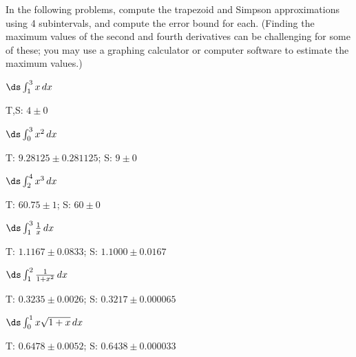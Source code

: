\begin{enumialphparenastyle}

In the following problems, compute the trapezoid and Simpson
approximations using 4 subintervals, and compute the error bound
for each. (Finding the maximum values of the second and fourth
derivatives can be challenging for some of these; you may use a
graphing calculator or computer software to estimate the maximum
values.) 




\begin{ex}
 $\ds\int_1^3 x\,dx$
\begin{sol}
 T,S: $4\pm0$
\end{sol}
\end{ex}

\begin{ex}
 $\ds\int_0^3 x^2\,dx$
\begin{sol}
 T: $9.28125\pm0.281125 $; S: $9\pm0$
\end{sol}
\end{ex}

\begin{ex}
 $\ds\int_2^4 x^3\,dx$
\begin{sol}
 T: $60.75\pm1$; S: $60\pm0$
\end{sol}
\end{ex}

\begin{ex}
 $\ds\int_1^3 {1\over x}\,dx$
\begin{sol}
 T: $1.1167\pm 0.0833$; S: $1.1000\pm 0.0167$
\end{sol}
\end{ex}

\begin{ex}
 $\ds\int_1^2 {1\over 1+x^2}\,dx$
\begin{sol}
 T: $0.3235\pm 0.0026$; S: $0.3217\pm 0.000065$
\end{sol}
\end{ex}

\begin{ex}
 $\ds\int_0^1 x\sqrt{1+x}\,dx$
\begin{sol}
 T: $0.6478\pm 0.0052$; S: $0.6438\pm 0.000033$
\end{sol}
\end{ex}


\end{enumialphparenastyle}

